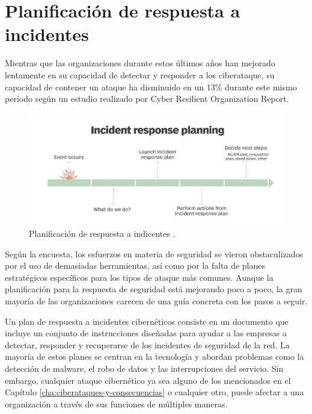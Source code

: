 \chapter{Planificación de respuesta a incidentes}
\label{cha:planificacion-de-respuesta}

Mientras que las organizaciones durante estos últimos años han mejorado lentamente en su capacidad 
de detectar y responder a los ciberataque, su capacidad de contener un ataque ha disminuido en un 
13\% durante este mismo período según un estudio realizado por Cyber Resilient Organization Report.\cite{ibm-article}

\begin{figure}[H]
  		   \centering
     		   \includegraphics[width=6in]{planif-respuesta.png}
  		   \caption{Planificación de respuesta a indicentes \cite{plan-respuesta}.}
  		   \label{img:planif-respuesta}
\end{figure}

Según la encuesta, los esfuerzos en materia de seguridad se vieron obstaculizados por el uso de 
demasiadas herramientas, así como por la falta de planes estratégicos específicos para los tipos de 
ataque más comunes. Aunque la planificación para la respuesta de seguridad está mejorando poco a 
poco, la gran mayoría de las organizaciones carecen de una guía concreta con los pasos a seguir.

Un plan de respuesta a incidentes cibernéticos consiste en un documento que incluye un conjunto 
de instrucciones diseñadas para ayudar a las empresas a detectar, responder y recuperarse de los 
incidentes de seguridad de la red. La mayoría de estos planes se centran en la tecnología y abordan 
problemas como la detección de malware, el robo de datos y las interrupciones del servicio. Sin 
embargo, cualquier ataque cibernético ya sea alguno de los mencionados en el Capítulo 
\ref{cha:ciberataques-y-consecuencias} o cualquier otro, puede afectar a una organización a través 
de sus funciones de múltiples maneras. \cite{pri}

